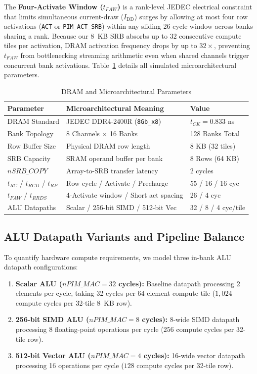 \documentclass[conference]{IEEEtran}
\begin{document}
The \textbf{Four-Activate Window ($t_{FAW}$)} is a rank-level JEDEC electrical constraint that limits simultaneous current-draw ($I_{\text{DD}}$) surges by allowing at most four row activations (\texttt{ACT} or \texttt{PIM\_ACT\_SRB}) within any sliding $26$-cycle window across banks sharing a rank. Because our 8~KB SRB absorbs up to $32$ consecutive compute tiles per activation, DRAM activation frequency drops by up to $32\times$, preventing $t_{FAW}$ from bottlenecking streaming arithmetic even when shared channels trigger concurrent bank activations. Table~\ref{tab:dram_params} details all simulated microarchitectural parameters.

\begin{table}[t]
\centering
\caption{DRAM and Microarchitectural Parameters}
\label{tab:dram_params}
\footnotesize
\setlength{\tabcolsep}{4pt}
\begin{tabularx}{\columnwidth}{lXl}
\toprule
\textbf{Parameter} & \textbf{Microarchitectural Meaning} & \textbf{Value} \\
\midrule
DRAM Standard & JEDEC DDR4-2400R (\texttt{8Gb\_x8}) & $t_{CK} = 0.833$ ns \\
Bank Topology & 8 Channels $\times$ 16 Banks & 128 Banks Total \\
Row Buffer Size & Physical DRAM row length & 8 KB (32 tiles) \\
SRB Capacity & SRAM operand buffer per bank & 8 Rows (64 KB) \\
$nSRB\_COPY$ & Array-to-SRB transfer latency & 2 cycles \\
$t_{RC}$ / $t_{RCD}$ / $t_{RP}$ & Row cycle / Activate / Precharge & 55 / 16 / 16 cyc \\
$t_{FAW}$ / $t_{RRDS}$ & 4-Activate window / Short act spacing & 26 / 4 cyc \\
ALU Datapaths & Scalar / 256-bit SIMD / 512-bit Vec & 32 / 8 / 4 cyc/tile \\
\bottomrule
\end{tabularx}
\end{table}

\subsection{ALU Datapath Variants and Pipeline Balance}
To quantify hardware compute requirements, we model three in-bank ALU datapath configurations:
\begin{enumerate}
    \item \textbf{Scalar ALU ($nPIM\_MAC = 32$ cycles):} Baseline datapath processing 2 elements per cycle, taking 32 cycles per 64-element compute tile ($1,024$ compute cycles per 32-tile $8$~KB row).
    \item \textbf{256-bit SIMD ALU ($nPIM\_MAC = 8$ cycles):} 8-wide SIMD datapath processing 8 floating-point operations per cycle ($256$ compute cycles per 32-tile row).
    \item \textbf{512-bit Vector ALU ($nPIM\_MAC = 4$ cycles):} 16-wide vector datapath processing 16 operations per cycle ($128$ compute cycles per 32-tile row).
\end{enumerate}
\end{document}
